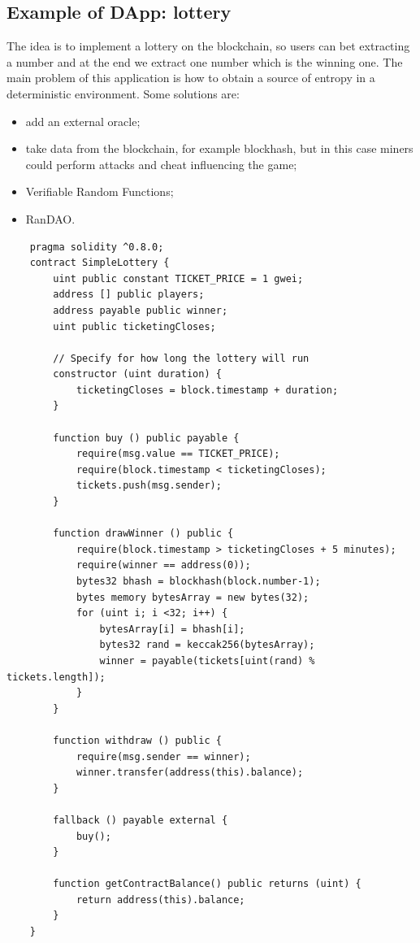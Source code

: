 \subsection{Example of DApp: lottery}
The idea is to implement a lottery on the blockchain, so users can bet extracting a number and at the end we extract one number which is the winning one.
The main problem of this application is how to obtain a source of entropy in a deterministic environment.
Some solutions are:
\begin{itemize}
    \item add an external oracle;
    \item take data from the blockchain, for example blockhash, but in this case miners could perform attacks and cheat influencing the game;
    \item Verifiable Random Functions;
    \item RanDAO.
\end{itemize}

\begin{verbatim}
    pragma solidity ^0.8.0;
    contract SimpleLottery {
        uint public constant TICKET_PRICE = 1 gwei;
        address [] public players;
        address payable public winner;
        uint public ticketingCloses;

        // Specify for how long the lottery will run
        constructor (uint duration) {
            ticketingCloses = block.timestamp + duration;
        }
 
        function buy () public payable {
            require(msg.value == TICKET_PRICE);
            require(block.timestamp < ticketingCloses);
            tickets.push(msg.sender);
        }

        function drawWinner () public {
            require(block.timestamp > ticketingCloses + 5 minutes);
            require(winner == address(0));
            bytes32 bhash = blockhash(block.number-1);
            bytes memory bytesArray = new bytes(32);
            for (uint i; i <32; i++) {
                bytesArray[i] = bhash[i];
                bytes32 rand = keccak256(bytesArray);
                winner = payable(tickets[uint(rand) % tickets.length]);
            }
        }
            
        function withdraw () public {
            require(msg.sender == winner);
            winner.transfer(address(this).balance);
        }

        fallback () payable external {
            buy(); 
        }

        function getContractBalance() public returns (uint) {
            return address(this).balance;
        }
    }
\end{verbatim}


